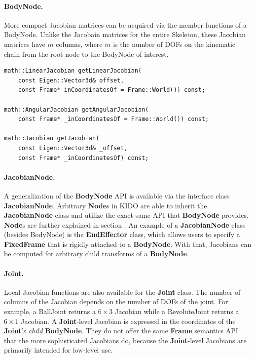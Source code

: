 

\paragraph{BodyNode.} More compact Jacobian matrices can be acquired
via the member functions of a BodyNode. Unlike the Jacobain matrices
for the entire Skeleton, these Jacobian matrices have $m$ columns, where $m$ is the number of DOFs on the kinematic chain from the root node to the BodyNode of interest.


\begin{lstlisting}[caption=BodyNode.h]
math::LinearJacobian getLinearJacobian(
    const Eigen::Vector3d& offset, 
    const Frame* inCoordinatesOf = Frame::World()) const;

math::AngularJacobian getAngularJacobian(
    const Frame* _inCoordinatesOf = Frame::World()) const;

math::Jacobian getJacobian(
    const Eigen::Vector3d& _offset, 
    const Frame* _inCoordinatesOf) const;
\end{lstlisting}

\paragraph{JacobianNode.} A generalization of the \textbf{BodyNode} API is available via the interface class \textbf{JacobianNode}. Arbitrary \textbf{Node}s in KIDO are able to inherit the \textbf{JacobianNode} class and utilize the exact same API that \textbf{BodyNode} provides. \textbf{Node}s are further explained in section . An example of a \textbf{JacobianNode} class (besides BodyNode) is the \textbf{EndEffector} class, which allows users to specify a \textbf{FixedFrame} that is rigidly attached to a \textbf{BodyNode}. With that, Jacobians can be computed for arbitrary child transforms of a \textbf{BodyNode}.

\paragraph{Joint.} Local Jacobian functions are also available for
the \textbf{Joint} class. The number of columns of the Jacobian depends on the
number of DOFs of the joint. For example, a BallJoint returns a $6
\times 3$ Jacobian while a RevoluteJoint returns a $6 \times 1$ Jacobian. A \textbf{Joint}-level Jacobian is expressed in the coordinates of the \textbf{Joint}'s \textit{child} \textbf{BodyNode}. They do not offer the same \textbf{Frame} semantics API that the more sophisticated Jacobians do, because the \textbf{Joint}-level Jacobians are primarily intended for low-level use.

